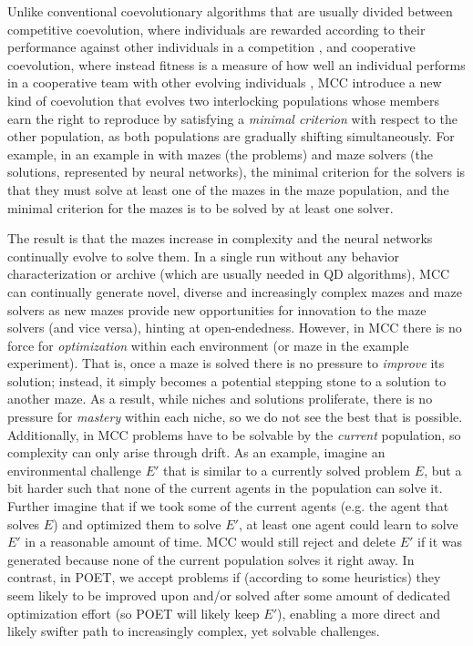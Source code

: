 \documentclass{article}
\begin{document}
Unlike conventional coevolutionary algorithms that are usually divided between competitive coevolution, where individuals are rewarded according to their performance against other individuals in a competition \cite{ficici:alife98}, and cooperative coevolution, where instead fitness is a measure of how well an individual performs in a cooperative team with other evolving individuals \cite{wiegand:gecco01}, MCC introduce a new kind of coevolution that evolves two interlocking populations whose members earn the right to reproduce by satisfying a \emph{minimal criterion} \cite{soros:alife14, soros2:alife14, lehman:gecco10a} with respect to the other population, as both populations are gradually shifting simultaneously.  For example, in an example in \citet{ brant:mcc17} with mazes (the problems) and maze solvers (the solutions, represented by neural networks), the minimal criterion for the solvers is that they must solve at least one of the mazes in the maze population, and the minimal criterion for the mazes is to be solved by at least one solver.

The result is that the mazes increase in complexity and the neural networks continually evolve to solve them. In a single run without any behavior characterization or archive (which are usually needed in QD algorithms), MCC can continually generate novel, diverse and increasingly complex mazes and maze solvers as new mazes provide new opportunities for innovation to the maze solvers (and vice versa), hinting at open-endedness.  However, in MCC there is no force for \emph{optimization} within each environment (or maze in the example experiment).  That is, once a maze is solved there is no pressure to \emph{improve} its solution; instead, it simply becomes a potential stepping stone to a solution to another maze.  As a result, while niches and solutions proliferate, there is no pressure for \emph{mastery} within each niche, so we do not see the best that is possible. Additionally, in MCC problems have to be solvable by the \emph{current} population, so complexity can only arise through drift. As an example, imagine an environmental challenge $E'$ that is similar to a currently solved problem $E$, but a bit harder such that none of the current agents in the population can solve it. Further imagine that if we took some of the current agents (e.g. the agent that solves $E$) and optimized them to solve $E'$, at least one agent could learn to solve $E'$ in a reasonable amount of time. MCC would still reject and delete $E'$ if it was generated because none of the current population solves it right away. In contrast, in POET, we accept problems if (according to some heuristics) they seem likely to be improved upon and/or solved after some amount of dedicated optimization effort (so POET will likely keep $E'$), enabling a more direct and likely swifter path to increasingly complex, yet solvable challenges.
\end{document}
